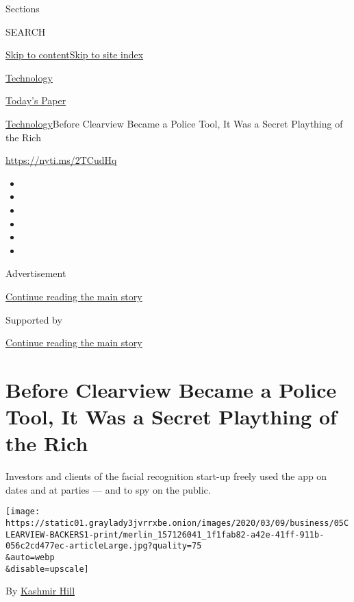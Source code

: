 Sections

SEARCH

\protect\hyperlink{site-content}{Skip to
content}\protect\hyperlink{site-index}{Skip to site index}

\href{https://www.nytimes3xbfgragh.onion/section/technology}{Technology}

\href{https://myaccount.nytimes3xbfgragh.onion/auth/login?response_type=cookie\&client_id=vi}{}

\href{https://www.nytimes3xbfgragh.onion/section/todayspaper}{Today's
Paper}

\href{/section/technology}{Technology}\textbar{}Before Clearview Became
a Police Tool, It Was a Secret Plaything of the Rich

\href{https://nyti.ms/2TCudHq}{https://nyti.ms/2TCudHq}

\begin{itemize}
\item
\item
\item
\item
\item
\item
\end{itemize}

Advertisement

\protect\hyperlink{after-top}{Continue reading the main story}

Supported by

\protect\hyperlink{after-sponsor}{Continue reading the main story}

\hypertarget{before-clearview-became-a-police-tool-it-was-a-secret-plaything-of-the-rich}{%
\section{Before Clearview Became a Police Tool, It Was a Secret
Plaything of the
Rich}\label{before-clearview-became-a-police-tool-it-was-a-secret-plaything-of-the-rich}}

Investors and clients of the facial recognition start-up freely used the
app on dates and at parties --- and to spy on the public.

\texttt{[image: https://static01.graylady3jvrrxbe.onion/images/2020/03/09/business/05CLEARVIEW-BACKERS1-print/merlin\_157126041\_1f1fab82-a42e-41ff-911b-056c2cd477ec-articleLarge.jpg?quality=75\\\&auto=webp\\\&disable=upscale]}

By \href{https://www.nytimes3xbfgragh.onion/by/kashmir-hill}{Kashmir
Hill}

